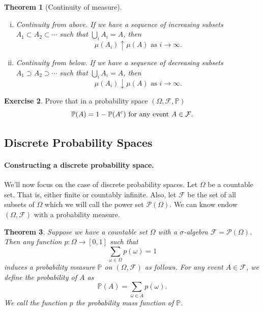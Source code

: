\documentclass[12pt]{article}
\newcommand{\calF}{\mathcal{F}}
\newcommand{\Prob}{\mathbb{P}}
\newtheorem{thm}{Theorem}[section]
\theoremstyle{definition}
\newtheorem{exer}[thm]{Exercise}
\theoremstyle{remark}
\numberwithin{equation}{section}
\begin{document}
 \begin{thm}[Continuity of measure]\leavevmode
   \begin{enumerate}[(i)]
     \item \emph{Continuity from above.} If we have a sequence of increasing subsets $A_1 \subset A_2 \subset \cdots $ such that $\bigcup_i A_i = A$, then 
       \begin{equation}
         \mu(A_i) \uparrow \mu(A) \text{ as } i \to \infty.
       \end{equation}
     \item \emph{Continuity from below.} If we have a sequence of decreasing subsets $A_1 \supset A_2 \supset \cdots $ such that $\bigcup_i A_i = A$, then 
       \begin{equation}
         \mu(A_i) \downarrow \mu(A) \text{ as } i \to \infty. 
       \end{equation}
 \end{enumerate}
 \end{thm}

 \begin{exer}
   Prove that in a probability space $(\Omega, \calF, \Prob)$ 
   \begin{equation} 
     \Prob(A) = 1 - \Prob(A^c) \text{ for any event } A \in \cal F.
   \end{equation}
 \end{exer}

\subsection{Discrete Probability Spaces}%
\label{sub:discrete_probability_spaces}

\paragraph{Constructing a discrete probability space.}

We'll now focus on the case of discrete probability spaces. Let $\Omega$ be a countable set. That is, either finite or countably infinite. Also, let $\calF$ be the set of all subsets of $\Omega$ which we will call the power set $\mathcal{P}(\Omega)$. We can know endow $(\Omega, \calF)$ with a probability measure. 

\begin{thm}
  Suppose we have a countable set $\Omega$ with a $\sigma$-algebra $\calF=\mathcal{P}(\Omega)$. Then any function $p \colon \Omega \to [0, 1]$ such that 
\begin{equation}
  \sum_{\omega\in\Omega} p(\omega) = 1
\end{equation}
induces a probability measure $\Prob$ on $(\Omega, \calF)$ as follows. For any event $A\in \calF$, we define the probability of $A$ as 
\begin{equation}
  \Prob(A) = \sum_{\omega \in A} p(\omega).
\end{equation}
We call the function $p$ the \emph{probability mass function} of $\Prob$.
\end{thm}
\end{document}

